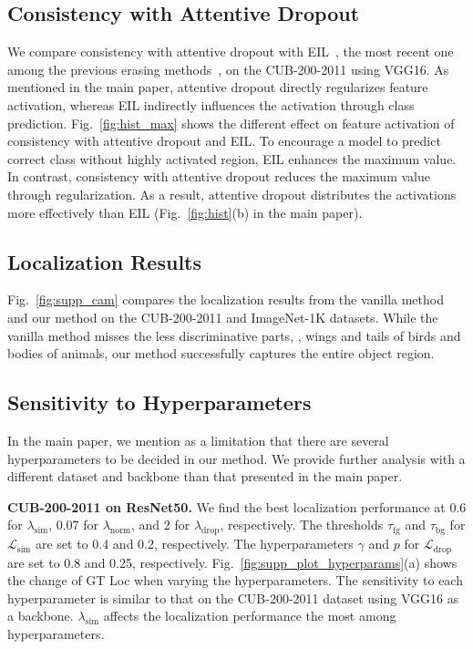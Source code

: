 \subsection{Consistency with Attentive Dropout}
We compare consistency with attentive dropout with EIL~\cite{mai2020erasing}, the most recent one among the previous erasing methods~\cite{choe2019attention, mai2020erasing,zhang2018adversarial}, on the CUB-200-2011 using VGG16. As mentioned in the main paper, attentive dropout directly regularizes feature activation, whereas EIL indirectly influences the activation through class prediction. Fig.~\ref{fig:hist_max} shows the different effect on feature activation of consistency with attentive dropout and EIL. To encourage a model to predict correct class without highly activated region, EIL enhances the maximum value. In contrast, consistency with attentive dropout reduces the maximum value through regularization. As a result, attentive dropout distributes the activations more effectively than EIL (Fig.~\ref{fig:hist}(b) in the main paper).



\subsection{Localization Results}
Fig.~\ref{fig:supp_cam} compares the localization results from the vanilla method~\cite{zhou2016learning} and our method on the CUB-200-2011 and ImageNet-1K datasets. While the vanilla method misses the less discriminative parts, \eg, wings and tails of birds and bodies of animals, our method successfully captures the entire object region.

\subsection{Sensitivity to Hyperparameters}
In the main paper, we mention as a limitation that there are several hyperparameters to be decided in our method. We provide further analysis with a different dataset and backbone than that presented in the main paper.

\noindent\textbf{CUB-200-2011 on ResNet50.}
We find the best localization performance at 0.6 for $\lambda_\text{sim}$, 0.07 for $\lambda_\text{norm}$, and 2 for $\lambda_\text{drop}$, respectively. The thresholds $\tau_\text{fg}$ and $\tau_\text{bg}$ for $\mathcal{L}_\text{sim}$ are set to 0.4 and 0.2, respectively. The hyperparameters $\gamma$ and $p$ for $\mathcal{L}_\text{drop}$ are set to 0.8 and 0.25, respectively.
Fig.~\ref{fig:supp_plot_hyperparams}(a) shows the change of GT Loc when varying the hyperparameters. The sensitivity to each hyperparameter is similar to that on the CUB-200-2011 dataset using VGG16 as a backbone. $\lambda_\text{sim}$ affects the localization performance the most among hyperparameters.

